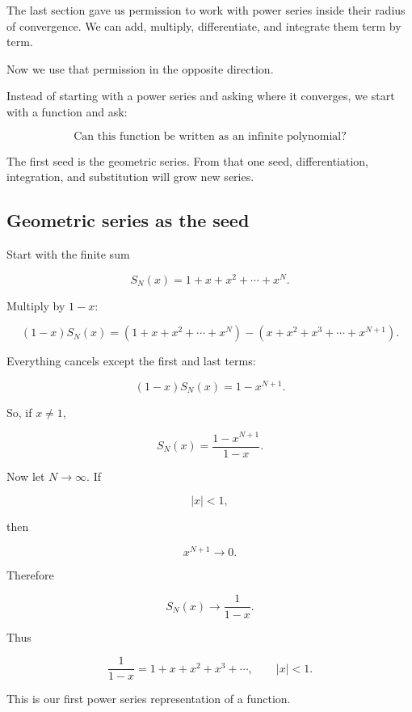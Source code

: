 The last section gave us permission to work with power series inside their radius of
convergence.  We can add, multiply, differentiate, and integrate them term by term.

Now we use that permission in the opposite direction.

Instead of starting with a power series and asking where it converges, we start with a
function and ask:

\[
\boxed{
\text{Can this function be written as an infinite polynomial?}
}
\]

The first seed is the geometric series.  From that one seed, differentiation,
integration, and substitution will grow new series.

\subsection{Geometric series as the seed}
\label{subsec:geometric-series-seed}

Start with the finite sum

\[
S_N(x)=1+x+x^2+\cdots+x^N.
\]

Multiply by \(1-x\):

\[
(1-x)S_N(x)
=
(1+x+x^2+\cdots+x^N)
-
(x+x^2+x^3+\cdots+x^{N+1}).
\]

Everything cancels except the first and last terms:

\[
(1-x)S_N(x)=1-x^{N+1}.
\]

So, if \(x\neq1\),

\[
S_N(x)=\frac{1-x^{N+1}}{1-x}.
\]

Now let \(N\to\infty\).  If

\[
|x|<1,
\]

then

\[
x^{N+1}\to0.
\]

Therefore

\[
S_N(x)\to \frac1{1-x}.
\]

Thus

\[
\boxed{
\frac1{1-x}=1+x+x^2+x^3+\cdots,
\qquad |x|<1.
}
\]

This is our first power series representation of a function.


